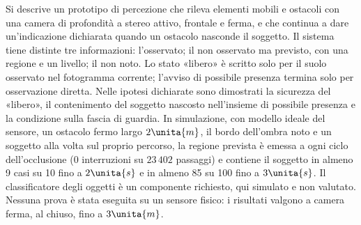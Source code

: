 Si descrive un prototipo di percezione che rileva elementi mobili e ostacoli con una camera di profondità a stereo attivo, frontale e ferma, e che continua a dare un'indicazione dichiarata quando un ostacolo nasconde il soggetto. Il sistema tiene distinte tre informazioni: l'osservato; il non osservato ma previsto, con una regione e un livello; il non noto. Lo stato «libero» è scritto solo per il suolo osservato nel fotogramma corrente; l'avviso di possibile presenza termina solo per osservazione diretta. Nelle ipotesi dichiarate sono dimostrati la sicurezza del «libero», il contenimento del soggetto nascosto nell'insieme di possibile presenza e la condizione sulla fascia di guardia. In simulazione, con modello ideale del sensore, un ostacolo fermo largo $2\unita{m}$, il bordo dell'ombra noto e un soggetto alla volta sul proprio percorso, la regione prevista è emessa a ogni ciclo dell'occlusione (0 interruzioni su $23\,402$ passaggi) e contiene il soggetto in almeno 9 casi su 10 fino a $2\unita{s}$ e in almeno 85 su 100 fino a $3\unita{s}$. Il classificatore degli oggetti è un componente richiesto, qui simulato e non valutato. Nessuna prova è stata eseguita su un sensore fisico: i risultati valgono a camera ferma, al chiuso, fino a $3\unita{m}$.
